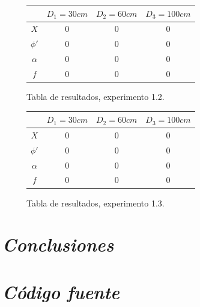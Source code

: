 \documentclass[conference]{IEEEtran}
\begin{document}
\begin{figure}[htbp]
\centering

\begin{tabular}{c|c|c|c|}
	 & $D_1=30cm$ & $D_2=60cm$ & $D_3=100 cm$\\
	\hline
	$X$ & 0 & 0 & 0\\
	\hline
	$\phi'$ & 0 & 0 & 0\\
	\hline
	$\alpha$ & 0 & 0 & 0\\
	\hline
	$f$ & 0 & 0 & 0\\
	\hline
\end{tabular}

\caption{Tabla de resultados, experimento 1.2.}
\label{res1.2}
\end{figure}



\begin{figure}[htbp]
\centering

\begin{tabular}{c|c|c|c|}
	 & $D_1=30cm$ & $D_2=60cm$ & $D_3=100 cm$\\
	\hline
	$X$ & 0 & 0 & 0\\
	\hline
	$\phi'$ & 0 & 0 & 0\\
	\hline
	$\alpha$ & 0 & 0 & 0\\
	\hline
	$f$ & 0 & 0 & 0\\
	\hline
\end{tabular}

\caption{Tabla de resultados, experimento 1.3.}
\label{res1.3}
\end{figure}




\section{\textit{Conclusiones}}
\textcolor{violet}{\lipsum[3]}


\section{\textit{Código fuente}}
\textcolor{violet}{\lipsum[3]}
\end{document}
